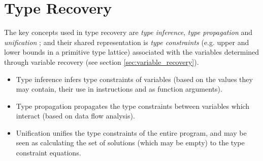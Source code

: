 
\section{Type Recovery}




The key concepts used in type recovery are \textit{type inference}, \textit{type propagation} and \textit{unification} \cite{mycroft_type_based_decompilation}; and their shared representation is \textit{type constraints} (e.g. upper and lower bounds in a primitive type lattice) associated with the variables determined through variable recovery (see section \ref{sec:variable_recovery}).

\begin{itemize}
	\item Type inference infers type constraints of variables (based on the values they may contain, their use in instructions and as function arguments).
	\item Type propagation propagates the type constraints between variables which interact (based on data flow analysis).
	\item Unification unifies the type constraints of the entire program, and may be seen as calculating the set of solutions (which may be empty) to the type constraint equations.
\end{itemize}






%
